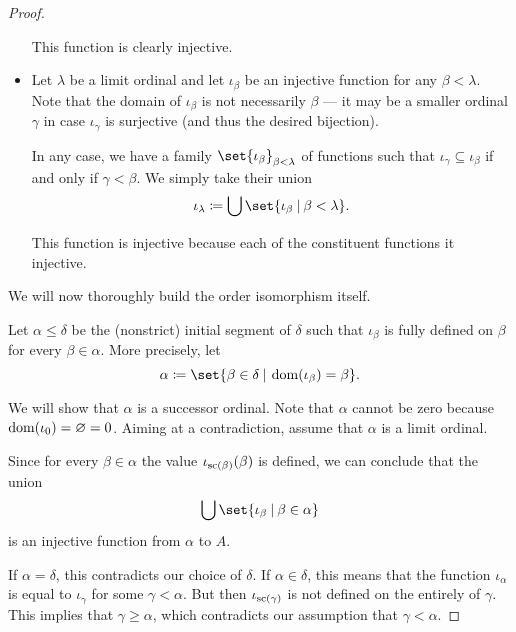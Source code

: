 \begin{proof}
\begin{itemize}
    This function is clearly injective.

    \item Let \( \lambda \) be a limit ordinal and let \( \iota_\beta \) be an injective function for any \( \beta < \lambda \). Note that the domain of \( \iota_\beta \) is not necessarily \( \beta \) --- it may be a smaller ordinal \( \gamma \) in case \( \iota_\gamma \) is surjective (and thus the desired bijection).

    In any case, we have a family \( \set{ \iota_\beta }_{\beta < \lambda} \) of functions such that \( \iota_\gamma \subseteq \iota_\beta \) if and only if \( \gamma < \beta \). We simply take their union
    \begin{equation*}
      \iota_\lambda \coloneqq \bigcup \set{ \iota_\beta \given \beta < \lambda }.
    \end{equation*}

    This function is injective because each of the constituent functions it injective.
  \end{itemize}

  We will now thoroughly build the order isomorphism itself.

  Let \( \alpha \leq \delta \) be the (nonstrict) initial segment of \( \delta \) such that \( \iota_\beta \) is fully defined on \( \beta \) for every \( \beta \in \alpha \). More precisely, let
  \begin{equation*}
    \alpha \coloneqq \set{ \beta \in \delta \given \dom(\iota_\beta) = \beta }.
  \end{equation*}

  We will show that \( \alpha \) is a successor ordinal. Note that \( \alpha \) cannot be zero because \( \operatorname{dom}(\iota_0) = \varnothing = 0 \). Aiming at a contradiction, assume that \( \alpha \) is a limit ordinal.

  Since for every \( \beta \in \alpha \) the value \( \iota_{\op{sc}(\beta)}(\beta) \) is defined, we can conclude that the union
  \begin{equation*}
    \bigcup\set{ \iota_\beta \given \beta \in \alpha }
  \end{equation*}
  is an injective function from \( \alpha \) to \( A \).

  If \( \alpha = \delta \), this contradicts our choice of \( \delta \). If \( \alpha \in \delta \), this means that the function \( \iota_\alpha \) is equal to \( \iota_\gamma \) for some \( \gamma < \alpha \). But then \( \iota_{\op{sc}(\gamma)} \) is not defined on the entirely of \( \gamma \). This implies that \( \gamma \geq \alpha \), which contradicts our assumption that \( \gamma < \alpha \).


\end{proof}
